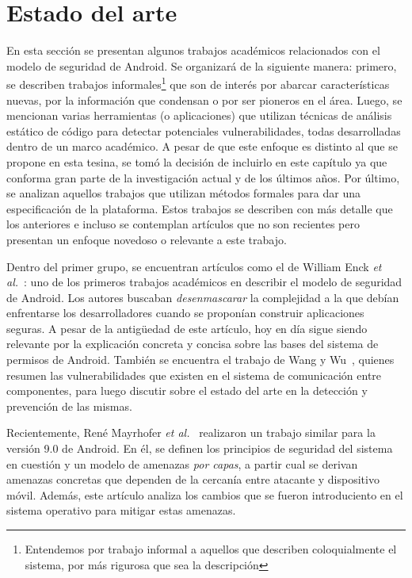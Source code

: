 
\chapter{Estado del arte}
\label{chapter:estado}

En esta sección se presentan algunos trabajos académicos relacionados con el
modelo de seguridad de Android. Se organizará de la siguiente manera: primero,
se describen trabajos informales\footnote{Entendemos por trabajo informal a
aquellos que describen coloquialmente el sistema, por más rigurosa que sea la
descripción} que son de interés por abarcar características nuevas, por la
información que condensan o por ser pioneros en el área. Luego, se mencionan
varias herramientas (o aplicaciones) que utilizan técnicas de análisis estático
de código para detectar potenciales vulnerabilidades, todas desarrolladas dentro
de un marco académico. A pesar de que este enfoque  es distinto al que se
propone en esta tesina, se tomó la decisión de incluirlo en este capítulo ya que
conforma gran parte de la investigación actual y de los últimos años. Por
último, se analizan aquellos trabajos que utilizan métodos formales para dar una
especificación de la plataforma. Estos trabajos se describen con más detalle que
los anteriores e incluso se contemplan artículos que no son recientes pero
presentan un enfoque novedoso o relevante a este trabajo.

Dentro del primer grupo, se encuentran artículos como el de William Enck
\textit{et al.}~\cite{enck}: uno de los primeros trabajos académicos en
describir el modelo de seguridad de Android. Los autores buscaban
\textit{desenmascarar} la complejidad a la que debían enfrentarse los
desarrolladores cuando se proponían construir aplicaciones seguras. A pesar de
la antigüedad de este artículo, hoy en día sigue siendo relevante por la
explicación concreta y concisa sobre las bases del sistema de permisos de
Android. También se encuentra el trabajo de Wang y Wu~\cite{wang}, quienes
resumen las vulnerabilidades que existen en el sistema de comunicación entre
componentes, para luego discutir sobre el estado del arte en la detección y
prevención de las mismas.

Recientemente, René Mayrhofer \textit{et al.}~\cite{mayrhofer} realizaron un
trabajo similar para la versión 9.0 de Android. En él, se definen los principios
de seguridad del sistema en cuestión y un modelo de amenazas \textit{por capas},
a partir cual se derivan amenazas concretas que dependen de la cercanía entre
atacante y dispositivo móvil. Además, este artículo analiza los cambios que se
fueron introduciento en el sistema operativo para mitigar estas amenazas.


